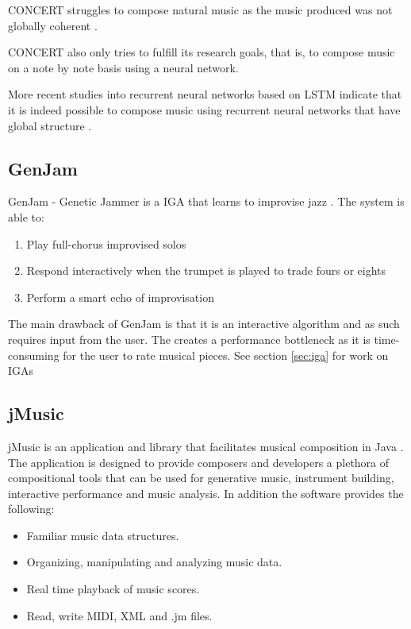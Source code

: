 CONCERT struggles to compose natural music as the music produced was not globally coherent \cite{mozer1994neural}. 

CONCERT also only tries to fulfill its research goals, that is, to compose music on a note by note basis using a neural network.

More recent studies into recurrent neural networks based on \ac{LSTM} indicate that it is indeed possible to compose music using recurrent neural networks that have global structure \cite{Eck2002}.

\subsection{GenJam}
GenJam - Genetic Jammer is a \acs{IGA} that learns to improvise jazz \cite{Biles1994}.
The system is able to: 
\begin{enumerate}
\item Play full-chorus improvised solos
\item Respond interactively when the trumpet is played to trade fours or eights
\item Perform a smart echo of improvisation
\end{enumerate}

The main drawback of GenJam is that it is an interactive algorithm and as such requires input from the user. The creates a performance bottleneck as it is time-consuming for the user to rate musical pieces.
See section \ref{sec:iga} for work on \acsp{IGA}

\subsection{jMusic}
jMusic is an application and library that facilitates musical composition in Java \cite{Sorensen}. The application is designed to provide composers and developers a plethora of compositional tools that can be used for generative music, instrument building, interactive performance and music analysis. In addition the software provides the following:
\begin{itemize}
\item Familiar music data structures.
\item Organizing, manipulating and analyzing music data.
\item Real time playback of music scores.
\item Read, write \ac{MIDI}, \ac{XML} and .jm files.
\end{itemize}

